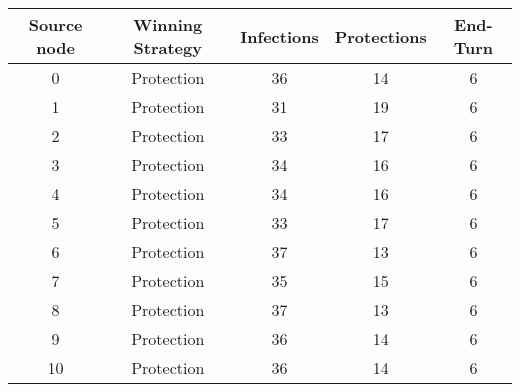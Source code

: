 \documentclass[results.tex]{subfiles}
\begin{document}
    \begin{center}
        \begin{tabular}{| c || c | c | c | c |}
            \hline
            {\bfseries Source node} & {\bfseries Winning Strategy} & {\bfseries Infections} & {\bfseries Protections}
            & {\bfseries End-Turn}
            \\  %
            \hline\hline
            0                       & Protection                   & 36                     & 14                      & 6                    \\
            \hline
            1                       & Protection                   & 31                     & 19                      & 6                    \\
            \hline
            2                       & Protection                   & 33                     & 17                      & 6                    \\
            \hline
            3                       & Protection                   & 34                     & 16                      & 6                    \\
            \hline
            4                       & Protection                   & 34                     & 16                      & 6                    \\
            \hline
            5                       & Protection                   & 33                     & 17                      & 6                    \\
            \hline
            6                       & Protection                   & 37                     & 13                      & 6                    \\
            \hline
            7                       & Protection                   & 35                     & 15                      & 6                    \\
            \hline
            8                       & Protection                   & 37                     & 13                      & 6                    \\
            \hline
            9                       & Protection                   & 36                     & 14                      & 6                    \\
            \hline
            10                      & Protection                   & 36                     & 14                      & 6                    \\

\end{tabular}
\end{center}
\end{document}
